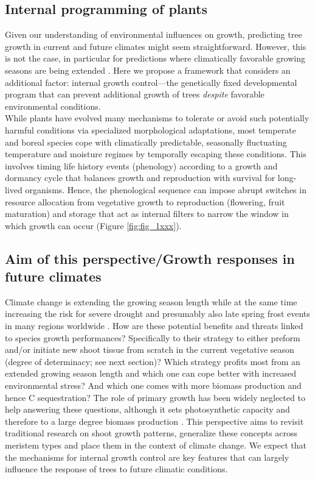 \documentclass{article}
\begin{document}
		
		\subsection*{Internal programming of plants}
		Given our understanding of environmental influences on growth, predicting tree growth in current and future climates might seem straightforward. However, this is not the case, in particular for predictions where climatically favorable growing seasons are being extended \citep{zohnerHowChangesSpring2021}. Here we propose a framework that considers an additional factor: internal growth control---the genetically fixed developmental program that can prevent additional growth of trees \textit{despite} favorable environmental conditions.\\
		
		While plants have evolved many mechanisms to tolerate or avoid such potentially harmful conditions via specialized morphological adaptations, most temperate and boreal species cope with climatically predictable, seasonally fluctuating temperature and moisture regimes by temporally escaping these conditions. This involves timing life history events (phenology) according to a growth and dormancy cycle that balances growth and reproduction with survival for long-lived organisms. Hence, the phenological sequence can impose abrupt switches in resource allocation from vegetative growth to reproduction (flowering, fruit maturation) and storage \citep{stearnsTradeOffsLifeHistoryEvolution1989, chapinEcologyEconomicsStorage1990} that act as internal filters to narrow the window in which growth can occur (Figure \ref{fig:fig_1xxx}).\\
		
		\subsection*{Aim of this perspective/Growth responses in future climates}%
		Climate change is extending the growing season length while at the same time increasing the risk for severe drought \citep{haoChangesSeverityCompound2018} and presumably also late spring frost events in many regions worldwide \citep{zohnerLatespringFrostRisk2020}. How are these potential benefits and threats linked to species growth performances? Specifically to their strategy to either preform and/or initiate new shoot tissue from scratch in the current vegetative season (degree of determinacy; see next section)? Which strategy profits most from an extended growing season length and which one can cope better with increased environmental stress? And which one comes with more biomass production and hence C sequestration? The role of primary growth has been widely neglected to help answering these questions, although it sets photosynthetic capacity and therefore to a large degree biomass production \citep{girardPolycyclismFundamentalTree2011}. 
		This perspective aims to revisit traditional research on shoot growth patterns, generalize these concepts across meristem types and place them in the context of climate change. We expect that the mechanisms for internal growth control are key features that can largely influence the response of trees to future climatic conditions.
			
\end{document}

